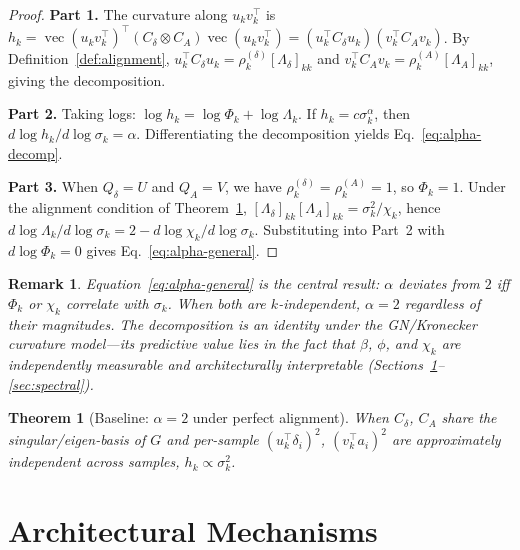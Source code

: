 \documentclass{article}
\newtheorem{theorem}{Theorem}
\newtheorem{remark}{Remark}
\DeclareMathOperator{\vecop}{vec}
\begin{document}
\begin{proof}
\textbf{Part 1.} The curvature along $u_k v_k^\top$ is $h_k = \vecop(u_k v_k^\top)^\top (C_\delta \otimes C_A) \vecop(u_k v_k^\top) = (u_k^\top C_\delta u_k)(v_k^\top C_A v_k)$. By Definition~\ref{def:alignment}, $u_k^\top C_\delta u_k = \rho_k^{(\delta)} [\Lambda_\delta]_{kk}$ and $v_k^\top C_A v_k = \rho_k^{(A)} [\Lambda_A]_{kk}$, giving the decomposition.

\textbf{Part 2.} Taking logs: $\log h_k = \log\Phi_k + \log\Lambda_k$. If $h_k = c\sigma_k^\alpha$, then $d\log h_k / d\log\sigma_k = \alpha$. Differentiating the decomposition yields Eq.~\eqref{eq:alpha-decomp}.

\textbf{Part 3.} When $Q_\delta = U$ and $Q_A = V$, we have $\rho_k^{(\delta)} = \rho_k^{(A)} = 1$, so $\Phi_k = 1$. Under the alignment condition of Theorem~\ref{thm:curvature-baseline}, $[\Lambda_\delta]_{kk} [\Lambda_A]_{kk} = \sigma_k^2 / \chi_k$, hence $d\log\Lambda_k / d\log\sigma_k = 2 - d\log\chi_k / d\log\sigma_k$. Substituting into Part~2 with $d\log\Phi_k = 0$ gives Eq.~\eqref{eq:alpha-general}.
\end{proof}

\begin{remark}
Equation~\eqref{eq:alpha-general} is the central result: $\alpha$ deviates from $2$ iff $\Phi_k$ or $\chi_k$ correlate with $\sigma_k$. When both are $k$-independent, $\alpha = 2$ regardless of their magnitudes. The decomposition is an identity under the GN/Kronecker curvature model---its predictive value lies in the fact that $\beta$, $\phi$, and $\chi_k$ are independently measurable and architecturally interpretable (Sections~\ref{sec:mechanisms}--\ref{sec:spectral}).
\end{remark}

\begin{theorem}[Baseline: $\alpha = 2$ under perfect alignment]\label{thm:curvature-baseline}
When $C_\delta$, $C_A$ share the singular/eigen-basis of $G$ and per-sample $(u_k^\top\delta_i)^2$, $(v_k^\top a_i)^2$ are approximately independent across samples, $h_k \propto \sigma_k^2$.
\end{theorem}

\section{Architectural Mechanisms}\label{sec:mechanisms}
\end{document}
